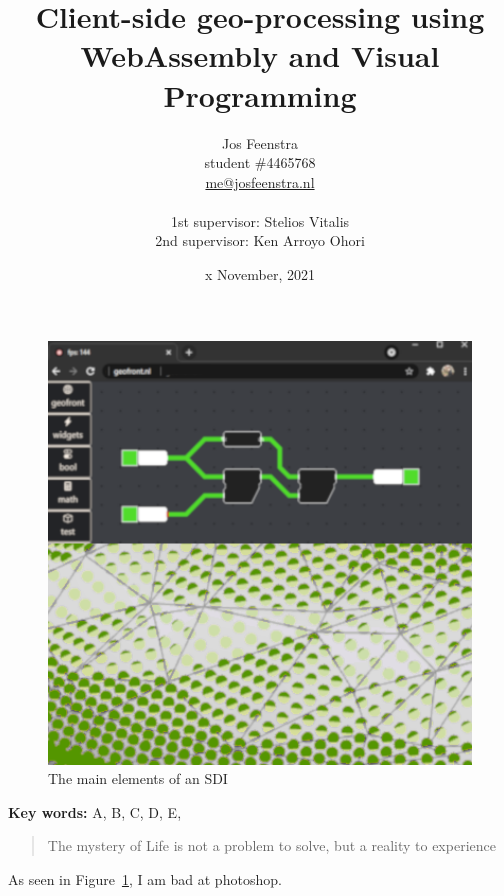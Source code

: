 \documentclass[a4paper,11pt]{scrartcl}
\title{Client-side geo-processing using WebAssembly and Visual Programming}
\author{
  Jos Feenstra\\
  student \#4465768 \\
  \url{me@josfeenstra.nl}\\
  \\
  1st supervisor: Stelios Vitalis \\
  2nd supervisor: Ken Arroyo Ohori \\
}
\date{x November, 2021}
\newcommand{\reffig}[1]{Figure~\ref{#1}}
\begin{document}
\maketitle

\begin{figure}
  \centering
  \graphicspath{ {images/} }
  \includegraphics[width=12cm]{thumbnail.png}
  \caption{The main elements of an SDI}
  \label{fig:thumbnail}
\end{figure}

\begin{flushleft}
  \textbf{Key words:} A, B, C, D, E, 
\end{flushleft}
\newpage


\begin{quote}
  The mystery of Life is not a problem to solve, but a reality to experience \cite{einstein}
\end{quote}

As seen in \reffig{fig:thumbnail}, I am bad at photoshop.

\newpage




\newpage
\printbibliography
\end{document}
